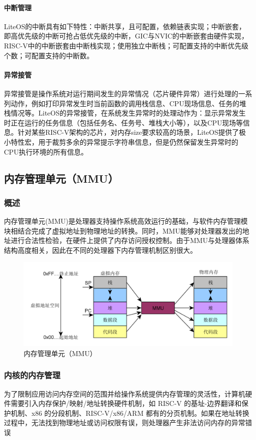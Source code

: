 \documentclass{article}
\begin{document}
\paragraph{中断管理}LiteOS的中断具有如下特性：中断共享，且可配置，依赖链表实现；中断嵌套，即高优先级的中断可抢占低优先级的中断，GIC与NVIC的中断嵌套由硬件实现，RISC-V中的中断嵌套由中断栈实现；使用独立中断栈；可配置支持的中断优先级个数；可配置支持的中断数。
\paragraph{异常接管}异常接管是操作系统对运行期间发生的异常情况（芯片硬件异常）进行处理的一系列动作，例如打印异常发生时当前函数的调用栈信息、CPU现场信息、任务的堆栈情况等。LiteOS的异常接管，在系统发生异常时的处理动作为：显示异常发生时正在运行的任务信息（包括任务名、任务号、堆栈大小等），以及CPU现场等信息。针对某些RISC-V架构的芯片，对内存size要求较高的场景，LiteOS提供了极小特性宏，用于裁剪多余的异常提示字符串信息，但是仍然保留发生异常时的CPU执行环境的所有信息\supercite{ref4}。

\subsection{内存管理单元（MMU）}
\subsubsection{概述}
内存管理单元(MMU)是处理器支持操作系统高效运行的基础，与软件内存管理模块相结合完成了虚拟地址到物理地址的转换。同时，MMU能够对处理器发出的地址进行合法性检验，在硬件上提供了内存访问授权控制。由于MMU与处理器体系结构高度相关，因此在不同的处理器下内存管理机制区别很大。
\begin{figure}[htbp]
    \centering
    \includegraphics[width = \textwidth]{figs/MMU.png}
    \caption{内存管理单元（MMU）}
    \label{fig:4}
\end{figure}
\subsubsection{内核的内存管理}
为了限制应用访问内存空间的范围并给操作系统提供内存管理的灵活性，计算机硬件需要引入内存保护/映射/地址转换硬件机制，如 RISC-V 的基址-边界翻译和保护机制、x86 的分段机制、RISC-V/x86/ARM 都有的分页机制。如果在地址转换过程中，无法找到物理地址或访问权限有误，则处理器产生非法访问内存的异常错误
\end{document}
